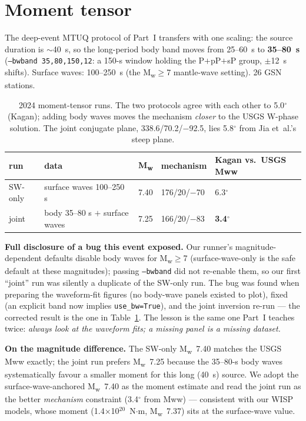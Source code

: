 \documentclass[11pt]{article}
\newcommand{\Mw}{M\textsubscript{w}}
\begin{document}
\section{Moment tensor}
The deep-event MTUQ protocol of Part~I transfers with one scaling: the source duration is
$\sim$40~s, so the long-period body band moves from 25--60~s to \textbf{35--80~s}
(\texttt{--bwband 35,80,150,12}: a 150-s window holding the P$+$pP$+$sP group, $\pm$12~s
shifts). Surface waves: 100--250~s (the \Mw$\geq$7 mantle-wave setting). 26 GSN stations.

\begin{table}[H]\centering\small
\begin{tabular}{lllll}
\toprule
run & data & \Mw & mechanism & Kagan vs.\ USGS Mww \\
\midrule
SW-only & surface waves 100--250 s & 7.40 & 176/20/$-$70 & 6.3$^\circ$ \\
joint & body 35--80 s $+$ surface waves & 7.25 & 166/20/$-$83 & \textbf{3.4$^\circ$} \\
\bottomrule
\end{tabular}
\caption{2024 moment-tensor runs. The two protocols agree with each other to 5.0$^\circ$
(Kagan); adding body waves moves the mechanism \emph{closer} to the USGS W-phase solution.
The joint conjugate plane, 338.6/70.2/$-$92.5, lies 5.8$^\circ$ from Jia et~al.'s steep plane.}
\label{tab:mt2024}
\end{table}

\textbf{Full disclosure of a bug this event exposed.} Our runner's magnitude-dependent
defaults disable body waves for \Mw$\geq$7 (surface-wave-only is the safe default at these
magnitudes); passing \texttt{--bwband} did not re-enable them, so our first ``joint'' run was
silently a duplicate of the SW-only run. The bug was found when preparing the waveform-fit
figures (no body-wave panels existed to plot), fixed (an explicit band now implies
\texttt{use\_bw=True}), and the joint inversion re-run --- the corrected result is the one in
Table~\ref{tab:mt2024}. The lesson is the same one Part~I teaches twice: \emph{always look at
the waveform fits; a missing panel is a missing dataset.}

\textbf{On the magnitude difference.} The SW-only \Mw~7.40 matches the USGS Mww exactly; the
joint run prefers \Mw~7.25 because the 35--80-s body waves systematically favour a smaller
moment for this long (40~s) source. We adopt the surface-wave-anchored \Mw~7.40 as the
moment estimate and read the joint run as the better \emph{mechanism} constraint (3.4$^\circ$
from Mww) --- consistent with our WISP models, whose moment (1.4$\times$10$^{20}$~N$\cdot$m,
\Mw~7.37) sits at the surface-wave value.
\end{document}
